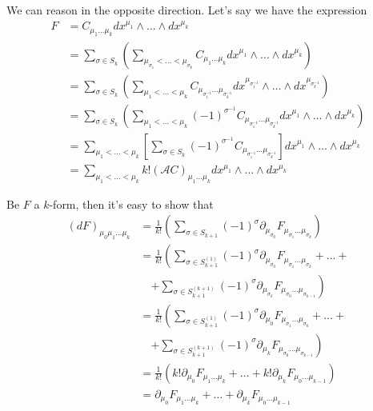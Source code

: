 \documentclass[a4paper,12pt]{article}
\numberwithin{equation}{section}
\numberwithin{thm}{section}
\numberwithin{exm}{section}
\newcommand{\A}{\mathcal A}
\newcommand{\p}{\partial}
\newcommand{\mo}{^{-1}}
\newcommand{\we}{{\wedge}}
\newcommand{\<}{{\langle}}
\renewcommand{\>}{{\rangle}}
\newcommand{\m}{{\mu}}
\newcommand{\s}{{\sigma}}
\begin{document}
We can reason in the opposite direction. Let's say we have the expression
	\begin{align}
	F & = C_{\m_1\ldots\m_k} dx^{\m_1} \we\ldots\we dx^{\m_k} \nonumber \\
	& = \sum_{\s\in S_k} \left( \sum_{\m_{\s_1}<\ldots<\m_{\s_k}} C_{\m_1\ldots\m_k} dx^{\m_1} \we\ldots\we dx^{\m_k} \right) \nonumber \\
	& = \sum_{\s\in S_k} \left( \sum_{\m_1<\ldots<\m_k} C_{\m_{\s\mo_1}\ldots\m_{\s\mo_k}} dx^{\m_{\s\mo_1}} \we\ldots\we dx^{\m_{\s\mo_k}} \right) \nonumber \\
	& = \sum_{\s\in S_k} \left( \sum_{\m_1<\ldots<\m_k} (-1)^{\s\mo} C_{\m_{\s\mo_1}\ldots\m_{\s\mo_k}} dx^{\m_1} \we\ldots\we dx^{\m_k} \right) \nonumber \\
	& = \sum_{\m_1<\ldots<\m_k} \left[\sum_{\s\in S_k}(-1)^{\s\mo} C_{\m_{\s\mo_1}\ldots\m_{\s\mo_k}} \right] dx^{\m_1} \we\ldots\we dx^{\m_k} \nonumber \\
	& = \sum_{\m_1<\ldots<\m_k} k! (\A C)_{\m_1\ldots\m_k} dx^{\m_1} \we\ldots\we dx^{\m_k}
	\end{align}

Be $F$ a $k$-form, then it's easy to show that
	\begin{align}
	(dF)_{\m_0\m_1\ldots\m_k} & = \frac{1}{k!}\left( \sum_{\s\in S_{k+1}} (-1)^\s \p_{\m_{\s_0}}F_{\m_{\s_1}\ldots \m_{\s_k}} \right) \nonumber \\
	& = \frac{1}{k!}\left( \sum_{\s\in S_{k+1}^{(1)}} (-1)^\s \p_{\m_{\s_0}}F_{\m_{\s_1}\ldots \m_{\s_k}} + \ldots +\right. \nonumber \\
	& \quad \left. + \sum_{\s\in S_{k+1}^{(k+1)}} (-1)^\s \p_{\m_{\s_{k}}}F_{\m_{\s_0}\ldots \m_{\s_{k-1}}} \right) \nonumber \\
	& = \frac{1}{k!}\left( \sum_{\s\in S_{k+1}^{(1)}} (-1)^\s \p_{\m_0}F_{\m_{\s_1}\ldots \m_{\s_k}} + \ldots +\right. \nonumber \\
	& \quad \left. + \sum_{\s\in S_{k+1}^{(k+1)}} (-1)^\s \p_{\m_{k}}F_{\m_{\s_0}\ldots \m_{\s_{k-1}}} \right) \nonumber \\
	& = \frac{1}{k!}\left( k! \p_{\m_0}F_{\m_1\ldots\m_k} + \ldots + k! \p_{\m_k}F_{\m_0\ldots\m_{k-1}}\right) \nonumber \\
	& = \p_{\m_0}F_{\m_1\ldots\m_k} + \ldots + \p_{\m_k}F_{\m_0\ldots\m_{k-1}}
	\end{align}
\end{document}
